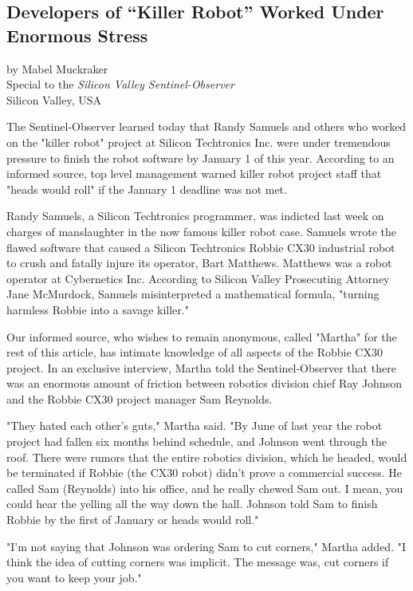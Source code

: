 \begin{center}
\section*{Developers of ``Killer Robot'' Worked Under Enormous Stress}
by Mabel Muckraker\\
Special to the \textit{Silicon Valley Sentinel-Observer}\\
Silicon Valley, USA
\end{center}

The Sentinel-Observer learned today that Randy Samuels and others who worked on the "killer robot" project at Silicon Techtronics Inc. were under tremendous pressure to finish the robot software by January 1 of this year. According to an informed source, top level management warned killer robot project staff that "heads would roll" if the January 1 deadline was not met.

Randy Samuels, a Silicon Techtronics programmer, was indicted last week on charges of manslaughter in the now famous killer robot case. Samuels wrote the flawed software that caused a Silicon Techtronics Robbie CX30 industrial robot to crush and fatally injure its operator, Bart Matthews. Matthews was a robot operator at Cybernetics Inc. According to Silicon Valley Prosecuting Attorney Jane McMurdock, Samuels misinterpreted a mathematical formula, "turning harmless Robbie into a savage killer."

Our informed source, who wishes to remain anonymous, called "Martha" for the rest of this article, has intimate knowledge of all aspects of the Robbie CX30 project. In an exclusive interview, Martha told the Sentinel-Observer that there was an enormous amount of friction between robotics division chief Ray Johnson and the Robbie CX30 project manager Sam Reynolds.

"They hated each other's guts," Martha said. "By June of last year the robot project had fallen six months behind schedule, and Johnson went through the roof. There were rumors that the entire robotics division, which he headed, would be terminated if Robbie (the CX30 robot) didn't prove a commercial success. He called Sam (Reynolds) into his office, and he really chewed Sam out. I mean, you could hear the yelling all the way down the hall. Johnson told Sam to finish Robbie by the first of January or heads would roll."

"I'm not saying that Johnson was ordering Sam to cut corners," Martha added. "I think the idea of cutting corners was implicit. The message was, cut corners if you want to keep your job."

